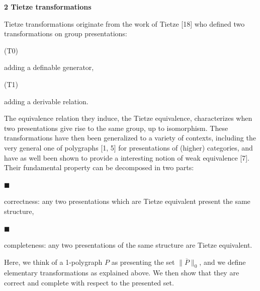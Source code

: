 \documentclass[10pt,a4paper]{amsart}
\begin{document}
 
 
 


 
\par\medskip\noindent\textbf{2 Tietze transformations}\par
 
 
Tietze transformations originate from the work of Tietze [18] who defined two transformations on group presentations:\par
  (T0)  
 
adding a definable generator,\par
 
  (T1)  
 
adding a derivable relation.\par
 
   
The equivalence relation they induce, the Tietze equivalence, characterizes when two presentations give rise to the same group, up to isomorphism. These transformations have then been generalized to a variety of contexts, including the very general one of polygraphs [1, 5] for presentations of (higher) categories, and have as well been shown to provide a interesting notion of weak equivalence [7]. Their fundamental property can be decomposed in two parts:\par
  
\par\noindent  $\blacksquare$ 
 
correctness: any two presentations which are Tietze equivalent present the same structure,\par
 
 
 
\par\noindent  $\blacksquare$ 
 
completeness: any two presentations of the same structure are Tietze equivalent.\par
 
 
  
Here, we think of a 1-polygraph $P$ as presenting the set $\|\overline{P}\|_{0}$, and we define elementary transformations as explained above. We then show that they are correct and complete with respect to the presented set.\par
 
\end{document}
